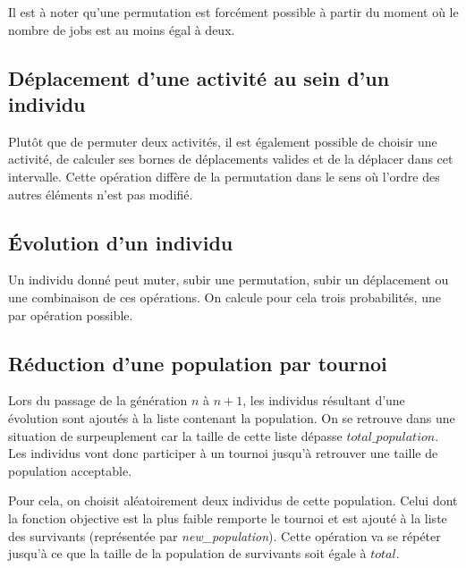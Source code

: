 Il est à noter qu'une permutation est forcément possible à partir du moment où le nombre de jobs est au moins égal à deux.

\newpage

\subsection{Déplacement d'une activité au sein d'un individu}



Plutôt que de permuter deux activités, il est également possible de choisir une activité, de calculer ses bornes de déplacements valides et de la déplacer dans cet intervalle. Cette opération diffère de la permutation dans le sens où l'ordre des autres éléments n'est pas modifié.

\subsection{Évolution d'un individu}



Un individu donné peut muter, subir une permutation, subir un déplacement ou une combinaison de ces opérations. On calcule pour cela trois probabilités, une par opération possible. 

\subsection{Réduction d'une population par tournoi}

Lors du passage de la génération $n$ à $n+1$, les individus résultant d'une évolution sont ajoutés à la liste contenant la population. On se retrouve dans une situation de surpeuplement car la taille de cette liste dépasse $total\_population$. Les individus vont donc participer à un tournoi jusqu'à retrouver une taille de population acceptable.

\newpage



Pour cela, on choisit aléatoirement deux individus de cette population. Celui dont la fonction objective est la plus faible remporte le tournoi et est ajouté à la liste des survivants (représentée par \textit{new\_population}). Cette opération va se répéter jusqu'à ce que la taille de la population de survivants soit égale à $total$.

